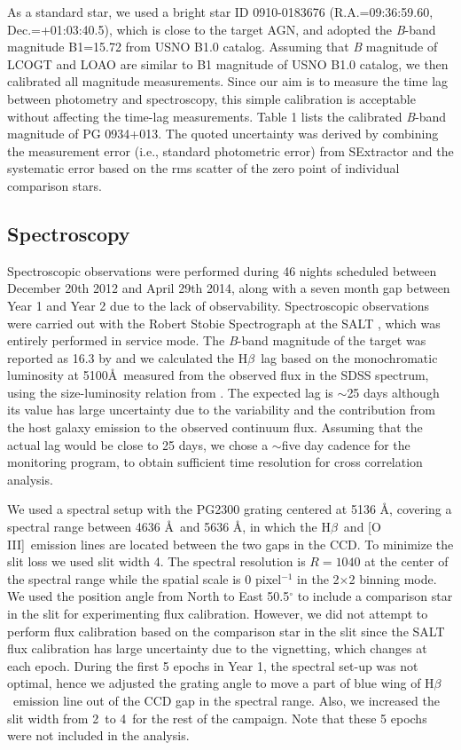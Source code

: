 \documentclass[iop]{emulateapj}
\newcommand{\Hb}{\rm H{$\beta$}}
\newcommand{\OIII}{[O {\small III}]}
\begin{document}
As a standard star, we used a bright star ID 0910-0183676 (R.A.=09:36:59.60, Dec.=+01:03:40.5), which is close to the target AGN, 
and adopted the \textit{B}-band magnitude B1=15.72 from USNO B1.0 catalog. Assuming that \textit{B} magnitude of LCOGT and LOAO are similar to B1 magnitude of USNO B1.0 catalog, we then calibrated all magnitude measurements. Since our aim is to measure the time lag between photometry and spectroscopy, this simple 
calibration is acceptable without affecting the time-lag measurements.  
Table 1 lists the calibrated \textit{B}-band magnitude of PG 0934+013. The quoted uncertainty was derived by combining the measurement
error (i.e., standard photometric error) from SExtractor and the systematic error based on the rms scatter of 
the zero point of individual comparison stars.
 
\subsection{Spectroscopy}

Spectroscopic observations were performed during 46 nights scheduled between December 20th 2012 and April 29th 2014, along with a seven month gap between Year 1 and Year 2 due to the lack of observability. Spectroscopic observations were carried out  with the Robert Stobie Spectrograph \citep[e.g.,][]{Burgh2003,Kobulnicky2003} at the SALT \citep{Buckley2006}, which was entirely performed in service mode. 
The \textit{B}-band magnitude of the target was reported as 16.3 by \cite{Schmidt&Green83} and we calculated the \Hb\ lag
based on the monochromatic luminosity at 5100\AA\ measured from the observed flux in the SDSS spectrum, using the size-luminosity relation from \cite{Bentz2013}. The expected lag is $\sim$25 days although its value has large uncertainty due to the variability and the contribution from the host galaxy emission to the observed continuum flux. Assuming that the actual lag would be close to 25 days, we chose a $\sim$five day cadence for the monitoring program, to obtain sufficient time resolution for cross correlation analysis.

We used a spectral setup with the PG2300 grating centered at 5136 \AA, covering a spectral range between 4636 \AA\ and 5636 \AA, in which the \Hb\ and \OIII\ emission lines are located between the two gaps in the CCD. To minimize the slit loss we used slit width 4\arcsec.
The spectral resolution is $R=1040$ at the center of the spectral range while the spatial scale is 0 pixel$^{-1}$ in the 2$\times$2 binning mode. We used the position angle from North to East 50.5$^{\circ}$ to include a comparison star in the slit for experimenting flux calibration. However, we did not attempt to perform flux calibration based on the comparison star in the slit since the SALT flux 
calibration has large uncertainty due to the vignetting, which changes at each epoch.
During the first 5 epochs in Year 1, the spectral set-up was not optimal, hence we adjusted the grating angle to move a part of blue wing of \Hb\ emission line out of the CCD gap in the spectral range. Also, we increased the slit width from 2\arcsec\ to 4\arcsec\ for the rest of the campaign. Note that these 5 epochs were not included in the analysis.
 
\end{document}
